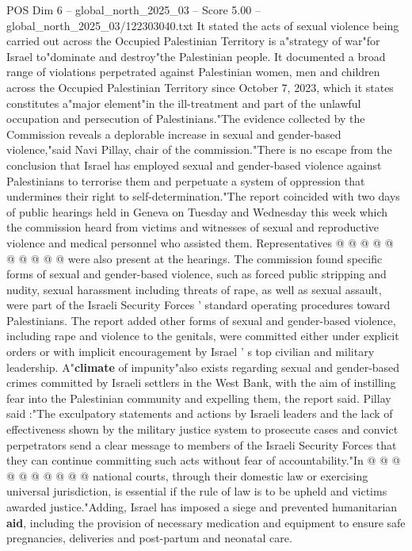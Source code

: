 \begin{textsample}{POS Dim 6 – global\_north\_2025\_03 – Score 5.00 – global\_north\_2025\_03/122303040.txt}  \label{ex:f6_pos_279}
It stated the acts of sexual violence being carried out across the Occupied Palestinian Territory is a"strategy of war"for Israel to"dominate and destroy"the Palestinian people.
It documented a broad range of violations perpetrated against Palestinian women, men and children across the Occupied Palestinian Territory since October 7, 2023, which it states constitutes a"major element"in the ill-treatment and part of the unlawful occupation and persecution of Palestinians."The evidence collected by the Commission reveals a deplorable increase in sexual and gender-based violence,"said Navi Pillay, chair of the commission."There is no escape from the conclusion that Israel has employed sexual and gender-based violence against Palestinians to terrorise them and perpetuate a system of oppression that undermines their right to self-determination."The report coincided with two days of public hearings held in Geneva on Tuesday and Wednesday this week which the commission heard from victims and witnesses of sexual and reproductive violence and medical personnel who assisted them.
Representatives @ @ @ @ @ @ @ @ @ @ were also present at the hearings.
The commission found specific forms of sexual and gender-based violence, such as forced public stripping and nudity, sexual harassment including threats of rape, as well as sexual assault, were part of the Israeli Security Forces ' standard operating procedures toward Palestinians.
The report added other forms of sexual and gender-based violence, including rape and violence to the genitals, were committed either under explicit orders or with implicit encouragement by Israel ' s top civilian and military leadership.
A"\textbf{climate} of impunity"also exists regarding sexual and gender-based crimes committed by Israeli settlers in the West Bank, with the aim of instilling fear into the Palestinian community and expelling them, the report said.
Pillay said :"The exculpatory statements and actions by Israeli leaders and the lack of effectiveness shown by the military justice system to prosecute cases and convict perpetrators send a clear message to members of the Israeli Security Forces that they can continue committing such acts without fear of accountability."In @ @ @ @ @ @ @ @ @ @ national courts, through their domestic law or exercising universal jurisdiction, is essential if the rule of law is to be upheld and victims awarded justice."Adding, Israel has imposed a siege and prevented humanitarian \textbf{aid}, including the provision of necessary medication and equipment to ensure safe pregnancies, deliveries and post-partum and neonatal care.

\end{textsample}

